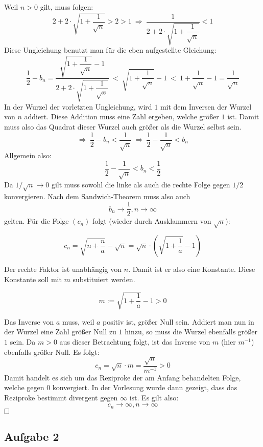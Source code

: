 \documentclass[10pt, a4paper]{article}
\begin{document}
		Weil $n > 0$ gilt, muss folgen:
		\[
			2+2\cdot\sqrt{1+\dfrac{1}{\sqrt{n}}} > 2 > 1 \ \Rightarrow \ \dfrac{1}{2+2\cdot\sqrt{1+\dfrac{1}{\sqrt{n}}}} < 1
		\]
		Diese Ungleichung benutzt man für die eben aufgestellte Gleichung:
		\[
			\dfrac{1}{2}-b_n = \dfrac{\sqrt{1+\dfrac{1}{\sqrt{n}}} - 1}{2+2\cdot\sqrt{1+\dfrac{1}{\sqrt{n}}}} \ < \ \sqrt{1+\dfrac{1}{\sqrt{n}}} - 1 \ < \  1+\dfrac{1}{\sqrt{n}}-1=\dfrac{1}{\sqrt{n}}
		\]
		In der Wurzel der vorletzten Ungleichung, wird $1$ mit dem Inversen der Wurzel von $n$ addiert. Diese Addition muss eine Zahl ergeben, welche größer $1$ ist. Damit muss also das Quadrat dieser Wurzel auch größer als die Wurzel selbst sein.
		\[
			\Rightarrow \ \dfrac{1}{2}-b_n < \dfrac{1}{\sqrt{n}} \ \Rightarrow \ \dfrac{1}{2}-\dfrac{1}{\sqrt{n}} < b_n
		\]
		Allgemein also:
		\[
			\dfrac{1}{2}-\dfrac{1}{\sqrt{n}} < b_n < \dfrac{1}{2}
		\]
		Da $1/\sqrt{n} \longrightarrow 0$ gilt muss sowohl die linke als auch die rechte Folge gegen $1/2$ konvergieren. Nach dem Sandwich-Theorem muss also auch
		\[
			b_n \longrightarrow \dfrac{1}{2}, n\longrightarrow \infty
		\]
		gelten.
		Für die Folge $(c_n)$ folgt (wieder durch Ausklammern von $\sqrt{n}$):

		\[
			c_n = \sqrt{n+\frac{n}{a}}-\sqrt{n} = \sqrt{n}\cdot \left( \sqrt{1+\dfrac{1}{a}} -1 \right)
		\]

		Der rechte Faktor ist unabhängig von $n$. Damit ist er also eine Konstante. Diese Konstante soll mit $m$ substituiert werden.

		\[
			m := \sqrt{1+\dfrac{1}{a}} -1 > 0
		\]

		Das Inverse von $a$ muss, weil $a$ positiv ist, größer Null sein. Addiert man nun in der Wurzel eine Zahl größer Null zu $1$ hinzu, so muss die Wurzel ebenfalls größer $1$ sein. Da $m >0 $ aus dieser Betrachtung folgt, ist das Inverse von $m$ (hier $m^{-1}$) ebenfalls größer Null. Es folgt:
		\[
			c_n = \sqrt{n}\cdot m = \dfrac{\sqrt{n}}{m^{-1}} > 0
		\]
		Damit handelt es sich um das Reziproke der am Anfang behandelten Folge, welche gegen $0$ konvergiert. In der Vorlesung wurde dann gezeigt, dass das Reziproke bestimmt divergent gegen $\infty$ ist. Es gilt also:
		\[
			c_n \rightarrow \infty, n \rightarrow \infty
		\] 
		$\hfill\Box$
		
		\newpage



	\subsection*{Aufgabe 2} %
	\label{sub:aufgabe_2}
	
\end{document}
